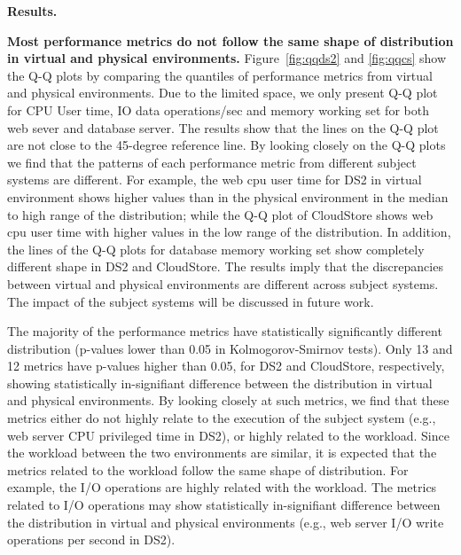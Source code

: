 \noindent \textbf{Results.}

\textbf{Most performance metrics do not follow the same shape of distribution in virtual and physical environments.} Figure~\ref{fig:qqds2} and \ref{fig:qqcs} show the Q-Q plots by comparing the quantiles of performance metrics from virtual and physical environments. Due to the limited space, we only present Q-Q plot for CPU User time, IO data operations/sec and memory working set for both web sever and database server. The results show that the lines on the Q-Q plot are not close to the 45-degree reference line. By looking closely on the Q-Q plots we find that the patterns of each performance metric from different subject systems are different. For example, the web cpu user time for DS2 in virtual environment shows higher values than in the physical environment in the median to high range of the distribution; while the Q-Q plot of CloudStore shows web cpu user time with higher values in the low range of the distribution. In addition, the lines of the Q-Q plots for database memory working set show completely different shape in DS2 and CloudStore. The results imply that the discrepancies between virtual and physical environments are different across subject systems. The impact of the subject systems will be discussed in future work.

The majority of the performance metrics have statistically significantly different distribution (p-values lower than 0.05 in Kolmogorov-Smirnov tests). Only 13 and 12 metrics have p-values higher than 0.05, for DS2 and CloudStore, respectively, showing statistically in-signifiant difference between the distribution in virtual and physical environments. By looking closely at such metrics, we find that these metrics either do not highly relate to the execution of the subject system (e.g., web server CPU privileged time in DS2), or highly related to the workload. Since the workload between the two environments are similar, it is expected that the metrics related to the workload follow the same shape of distribution. For example, the I/O operations are highly related with the workload. The metrics related to I/O operations may show statistically in-signifiant difference between the distribution in virtual and physical environments (e.g., web server I/O write operations per second in DS2). %


